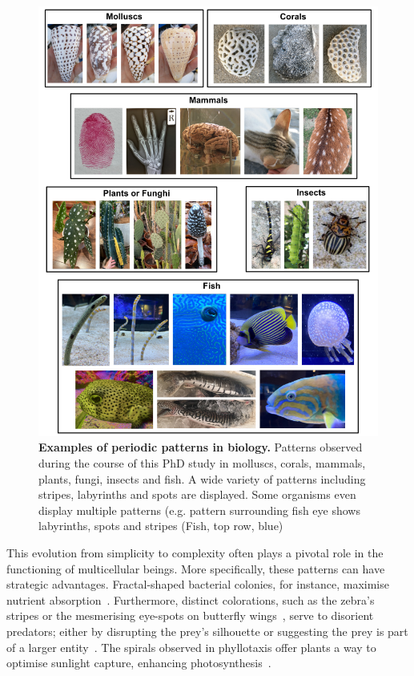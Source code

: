 \begin{figure}[h!]
    \centering
    \includegraphics[width=1\textwidth]{chapters/Introduction/pattern_examples}
    \caption{\textbf{Examples of periodic patterns in biology.} Patterns observed during the course of this PhD study in molluscs, corals, mammals, plants, fungi, insects and fish. A wide variety of patterns including stripes, labyrinths and spots are displayed. Some organisms even display multiple patterns (e.g. pattern surrounding fish eye shows labyrinths, spots and stripes (Fish, top row, blue)}
    \label{fig:pattern_examples}
\end{figure}
This evolution from simplicity to complexity often plays a pivotal role in the functioning of multicellular beings.
More specifically, these patterns can have strategic advantages.
Fractal-shaped bacterial colonies, for instance, maximise nutrient absorption~\parencite{Matsushita1990}.
Furthermore, distinct colorations, such as the zebra's stripes or the mesmerising eye-spots on butterfly wings~\parencite{Blest}, serve to disorient predators; either by disrupting the prey's silhouette or suggesting the prey is part of a larger entity~\parencite{Stevens2006}.
The spirals observed in phyllotaxis offer plants a way to optimise sunlight capture, enhancing photosynthesis~\parencite{Strauss2020}.

